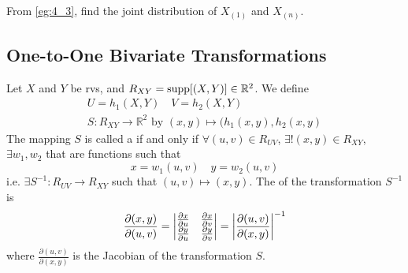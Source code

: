 \documentclass[notoc,notitlepage]{tufte-book}
\begin{document}
\begin{ex}
  From \cref{eg:4_3}, find the joint distribution of $X_{(1)}$ and $X_{(n)}$.
\end{ex}


\subsection{One-to-One Bivariate Transformations}%
\label{sub:one_to_one_bivariate_transformations}

\begin{defn}
\label{defn:one_to_one_bivariate_transformation}
Let $X$ and $Y$ be rvs, and $R_{XY} = \operatorname{supp}[(X, Y)] \in \mathbb{R}^2$. We define
  \begin{gather*}
    U = h_1(X, Y) \quad V = h_2(X, Y) \\
    S : R_{XY} \to \mathbb{R}^2 \text{ by } (x, y) \mapsto ( h_1(x, y), h_2(x, y )
  \end{gather*}
  The mapping $S$ is called a  if and only if  $\forall (u, v) \in R_{UV}$, $\exists! (x, y) \in R_{XY}$, $\exists w_1, w_2$ that are functions such that
  \begin{equation*}
    x = w_1(u, v) \quad y = w_2(u, v)
  \end{equation*}
  i.e. $\exists S^{-1} : R_{UV} \to R_{XY}$ such that $(u, v) \mapsto (x, y)$. The  of the transformation $S^{-1}$ is
  \begin{equation*}
    \frac{\partial(x, y)}{\partial (u, v)} = \begin{vmatrix}
      \frac{\partial x}{\partial u} & \frac{\partial x}{\partial v} \\
      \frac{\partial y}{\partial u} & \frac{\partial y}{\partial v}
    \end{vmatrix} = \left| \frac{\partial (u, v)}{\partial (x, y)} \right|^{-1}
  \end{equation*}
  where $\frac{\partial (u, v)}{\partial (x, y)}$ is the Jacobian of the transformation $S$.
\end{defn}
\end{document}
